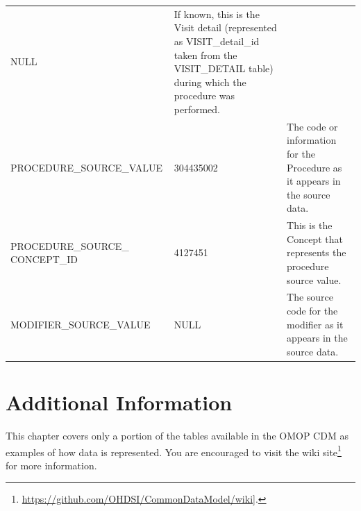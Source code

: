 \documentclass[11pt]{book}
\let\rmarkdownfootnote\footnote%
\def\footnote{\protect\rmarkdownfootnote}
\theoremstyle{definition}
\theoremstyle{definition}
\theoremstyle{definition}
\theoremstyle{remark}
\begin{document}
\begin{longtable}[]{@{}lll@{}}
\begin{minipage}[t]{0.15\columnwidth}
NULL\strut
\end{minipage} & \begin{minipage}[t]{0.49\columnwidth}\raggedright
If known, this is the Visit detail (represented as VISIT\_detail\_id taken from the VISIT\_DETAIL table) during which the procedure was performed.\strut
\end{minipage}\tabularnewline
\begin{minipage}[t]{0.28\columnwidth}\raggedright
PROCEDURE\_SOURCE\_VALUE\strut
\end{minipage} & \begin{minipage}[t]{0.15\columnwidth}\raggedright
304435002\strut
\end{minipage} & \begin{minipage}[t]{0.49\columnwidth}\raggedright
The code or information for the Procedure as it appears in the source data.\strut
\end{minipage}\tabularnewline
\begin{minipage}[t]{0.28\columnwidth}\raggedright
PROCEDURE\_SOURCE\_ CONCEPT\_ID\strut
\end{minipage} & \begin{minipage}[t]{0.15\columnwidth}\raggedright
4127451\strut
\end{minipage} & \begin{minipage}[t]{0.49\columnwidth}\raggedright
This is the Concept that represents the procedure source value.\strut
\end{minipage}\tabularnewline
\begin{minipage}[t]{0.28\columnwidth}\raggedright
MODIFIER\_SOURCE\_VALUE\strut
\end{minipage} & \begin{minipage}[t]{0.15\columnwidth}\raggedright
NULL\strut
\end{minipage} & \begin{minipage}[t]{0.49\columnwidth}\raggedright
The source code for the modifier as it appears in the source data.\strut
\end{minipage}\tabularnewline
\bottomrule
\end{longtable}

\hypertarget{additional-information}{%
\section{Additional Information}\label{additional-information}}

This chapter covers only a portion of the tables available in the OMOP CDM as examples of how data is represented. You are encouraged to visit the wiki site\footnote{\url{https://github.com/OHDSI/CommonDataModel/wiki}{]}.} for more information.
\end{document}
